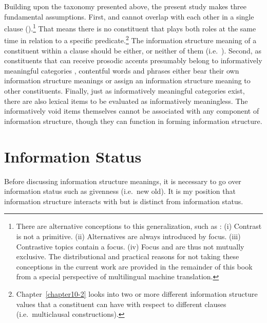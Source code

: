 Building upon the taxonomy presented above, the present study makes
three fundamental assumptions.  First,  and  cannot overlap
with each other in a single clause
(\citealt{engdahl:vallduvi:96}).\footnote{There are alternative
  conceptions to this generalization, such as \citet{krifka:08}: (i)
  Contrast is not a primitive. (ii) Alternatives are always introduced
  by focus. (iii) Contrastive topics contain a
  focus. (iv) Focus and  are thus not mutually exclusive. The
  distributional and practical reasons for not taking these
  conceptions in the current work are provided in the remainder of
  this book from a special perspective of multilingual machine
  translation.}  That means there is no constituent that plays both
roles at the same time in relation to a specific
predicate.\footnote{Chapter~\ref{chapter10-2} looks into two or more
  different information structure values that a constituent can have
  with respect to different clauses (i.e.\ multiclausal
  constructions).} The information structure meaning of a constituent
within a clause should be either, or neither of them
(i.e.\ ). Second, as constituents that can receive
prosodic accents presumably belong to informatively meaningful
categories \citep{lambrecht:96}, contentful words and phrases either
bear their own information structure meanings or assign an information
structure meaning to other constituents.  Finally, just as
informatively meaningful categories exist, there are also lexical
items to be evaluated as informatively meaningless. The informatively
void items themselves cannot be associated with any component of
information structure, though they can function in forming information
structure.




\section{Information Status}
\label{3:sec:status}




Before discussing information structure meanings, it is necessary to
go over information status such as givenness (i.e.\ new \vs old). It
is my position that information structure interacts with but is
distinct from information status.


